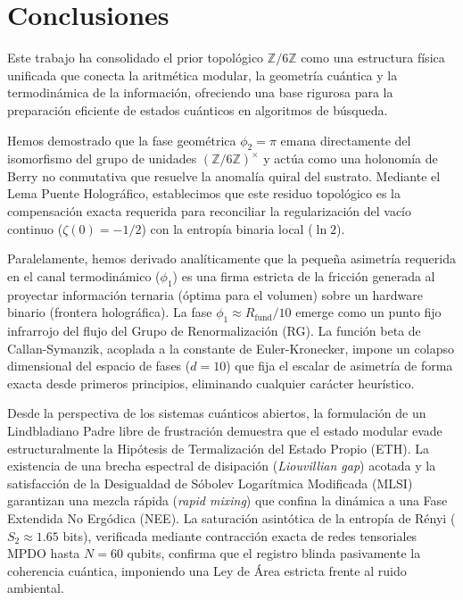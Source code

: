 \documentclass[12pt,a4paper]{article}
\theoremstyle{plain}
\theoremstyle{definition}
\theoremstyle{remark}
\begin{document}
\section{Conclusiones}
\label{sec:conclusiones}

Este trabajo ha consolidado el prior topológico $\mathbb{Z}/6\mathbb{Z}$ como una estructura física unificada que conecta la aritmética modular, la geometría cuántica y la termodinámica de la información, ofreciendo una base rigurosa para la preparación eficiente de estados cuánticos en algoritmos de búsqueda.

Hemos demostrado que la fase geométrica $\phi_2 = \pi$ emana directamente del isomorfismo del grupo de unidades $(\mathbb{Z}/6\mathbb{Z})^{\times}$ y actúa como una holonomía de Berry no conmutativa que resuelve la anomalía quiral del sustrato. Mediante el Lema Puente Holográfico, establecimos que este residuo topológico es la compensación exacta requerida para reconciliar la regularización del vacío continuo ($\zeta(0) = -1/2$) con la entropía binaria local ($\ln 2$). 

Paralelamente, hemos derivado analíticamente que la pequeña asimetría requerida en el canal termodinámico ($\phi_1$) es una firma estricta de la fricción generada al proyectar información ternaria (óptima para el volumen) sobre un hardware binario (frontera holográfica). La fase $\phi_1 \approx R_{\text{fund}}/10$ emerge como un punto fijo infrarrojo del flujo del Grupo de Renormalización (RG). La función beta de Callan-Symanzik, acoplada a la constante de Euler-Kronecker, impone un colapso dimensional del espacio de fases ($d=10$) que fija el escalar de asimetría de forma exacta desde primeros principios, eliminando cualquier carácter heurístico.

Desde la perspectiva de los sistemas cuánticos abiertos, la formulación de un Lindbladiano Padre libre de frustración demuestra que el estado modular evade estructuralmente la Hipótesis de Termalización del Estado Propio (ETH). La existencia de una brecha espectral de disipación (\textit{Liouvillian gap}) acotada y la satisfacción de la Desigualdad de Sóbolev Logarítmica Modificada (MLSI) garantizan una mezcla rápida (\textit{rapid mixing}) que confina la dinámica a una Fase Extendida No Ergódica (NEE). La saturación asintótica de la entropía de Rényi ($S_2 \approx 1.65$ bits), verificada mediante contracción exacta de redes tensoriales MPDO hasta $N=60$ qubits, confirma que el registro blinda pasivamente la coherencia cuántica, imponiendo una Ley de Área estricta frente al ruido ambiental.
\end{document}
